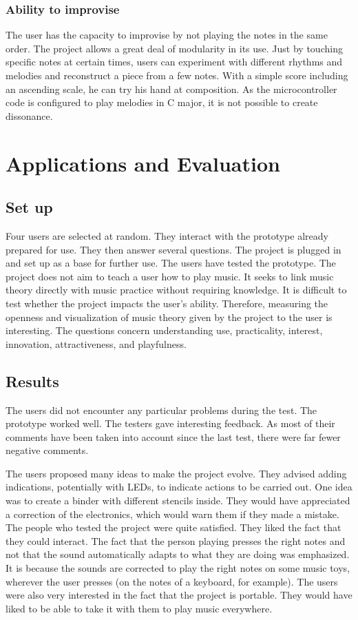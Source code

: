 \subsubsection{Ability to improvise} 

The user has the capacity to improvise by not playing the notes in the same order.
The project allows a great deal of modularity in its use. Just by touching specific
notes at certain times, users can experiment with different rhythms and melodies
and reconstruct a piece from a few notes.
With a simple score including an ascending scale, he can try his hand at composition.
As the microcontroller code is configured to play melodies in C major, it is not
possible to create dissonance.


\section{Applications and Evaluation}

\subsection{Set up}

Four users are selected at random. They interact with the prototype already prepared for use. They then answer several questions. The project is plugged in and set up as a base for further use. The users have tested the prototype. The project does not aim to teach a user how to play music. It seeks to link music theory directly with music practice without requiring knowledge.
It is difficult to test whether the project impacts the user's ability. Therefore, measuring the openness and visualization of music theory given by the project to the user is interesting. The questions concern understanding use, practicality, interest, innovation, attractiveness, and playfulness.

\subsection{Results}

The users did not encounter any particular problems during the test. The prototype worked well. The testers gave interesting feedback. As most of their comments have been taken into account since the last test, there were far fewer negative comments.

The users proposed many ideas to make the project evolve. They advised adding indications, potentially with LEDs, to indicate actions to be carried out. One idea was to create a binder with different stencils inside. They would have appreciated a correction of the electronics, which would warn them if they made a mistake. The people who tested the project were quite satisfied. They liked the fact that they could interact. The fact that the person playing presses the right notes and not that the sound automatically adapts to what they are doing was emphasized. It is because the sounds are corrected to play the right notes on some music toys, wherever the user presses (on the notes of a keyboard, for example). The users were also very interested in the fact that the project is portable. They would have liked to be able to take it with them to play music everywhere.

